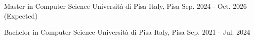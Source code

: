 

\begin{cventries}

  \cventry
    {Master in Computer Science} %
    {Università di Pisa} %
    {Italy, Pisa} %
    {Sep. 2024 - Oct. 2026 (Expected)} %
    {
      \begin{cvitems} %
      \end{cvitems}
    }

  \cventry
  {Bachelor in Computer Science} %
  {Università di Pisa} %
  {Italy, Pisa} %
  {Sep. 2021 - Jul. 2024} %
  {
    \begin{cvitems} %
    \end{cvitems}
  }

\end{cventries}
